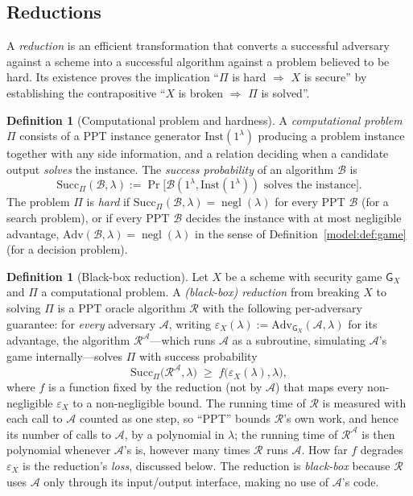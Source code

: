 \documentclass[11pt,a4paper]{article}
\theoremstyle{definition}
\newtheorem{definition}[theorem]{Definition}
\theoremstyle{remark}
\DeclareMathOperator{\negl}{negl}
\begin{document}
\subsection{Reductions}\label{model:subsec:reductions}

A \emph{reduction} is an efficient transformation that converts a
successful adversary against a scheme into a successful algorithm
against a problem believed to be hard. Its existence proves the
implication ``\(\Pi\) is hard \(\Rightarrow\) \(X\) is secure'' by
establishing the contrapositive ``\(X\) is broken \(\Rightarrow\)
\(\Pi\) is solved''.

\begin{definition}[Computational problem and hardness]
\label{model:def:problem}
A \emph{computational problem} \(\Pi\) consists of a PPT instance
generator \(\mathrm{Inst}(1^\lambda)\) producing a problem instance
together with any side information, and a relation deciding when a
candidate output \emph{solves} the instance. The \emph{success
probability} of an algorithm \(\mathcal{B}\) is
\[
  \mathrm{Succ}_\Pi(\mathcal{B},\lambda)
  := \Pr\bigl[\mathcal{B}(1^\lambda, \mathrm{Inst}(1^\lambda))
     \text{ solves the instance}\bigr].
\]
The problem \(\Pi\) is \emph{hard} if
\(\mathrm{Succ}_\Pi(\mathcal{B},\lambda) = \negl(\lambda)\) for every
PPT \(\mathcal{B}\) (for a search problem), or if every PPT
\(\mathcal{B}\) decides the instance with at most negligible
advantage, \(\mathrm{Adv}(\mathcal{B},\lambda) = \negl(\lambda)\) in
the sense of Definition~\ref{model:def:game} (for a decision problem).
\end{definition}

\begin{definition}[Black-box reduction]\label{model:def:reduction}
Let \(X\) be a scheme with security game \(\mathsf{G}_X\) and \(\Pi\)
a computational problem. A \emph{(black-box) reduction} from breaking
\(X\) to solving \(\Pi\) is a PPT oracle algorithm \(\mathcal{R}\)
with the following per-adversary guarantee: for \emph{every}
adversary \(\mathcal{A}\), writing
\(\varepsilon_X(\lambda):=\mathrm{Adv}_{\mathsf{G}_X}(\mathcal{A},
\lambda)\) for its advantage, the algorithm
\(\mathcal{R}^{\mathcal{A}}\)---which runs \(\mathcal{A}\) as a
subroutine, simulating \(\mathcal{A}\)'s game internally---solves
\(\Pi\) with success probability
\[
  \mathrm{Succ}_\Pi\bigl(\mathcal{R}^{\mathcal{A}},\lambda\bigr)
  \;\geq\; f\bigl(\varepsilon_X(\lambda), \lambda\bigr),
\]
where \(f\) is a function fixed by the reduction (not by
\(\mathcal{A}\)) that maps every non-negligible \(\varepsilon_X\) to
a non-negligible bound. The running time of \(\mathcal{R}\) is
measured with each call to \(\mathcal{A}\) counted as one step, so
``PPT'' bounds \(\mathcal{R}\)'s own work, and hence its number of
calls to \(\mathcal{A}\), by a polynomial in \(\lambda\); the running
time of \(\mathcal{R}^{\mathcal{A}}\) is then polynomial whenever
\(\mathcal{A}\)'s is, however many times \(\mathcal{R}\) runs
\(\mathcal{A}\). How far \(f\) degrades \(\varepsilon_X\) is the
reduction's \emph{loss}, discussed below.
The reduction is
\emph{black-box} because \(\mathcal{R}\) uses \(\mathcal{A}\) only
through its input/output interface, making no use of
\(\mathcal{A}\)'s code.
\end{definition}
\end{document}

